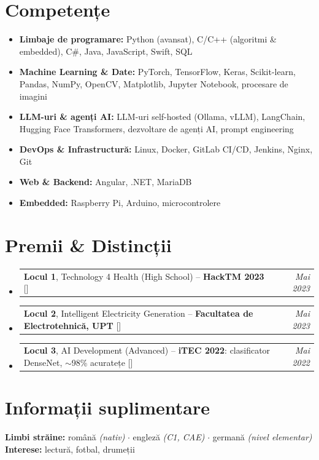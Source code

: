 \documentclass[a4paper,11pt]{article}
\makeatletter
\newcommand{\resumeItem}[2]{
  \item{
    \textbf{#1}{\hspace{0.5mm}#2 \vspace{-0.5mm}}
  }
}
\newcommand{\resumePOR}[3]{
\vspace{0.5mm}\item
    \begin{tabular*}{0.97\textwidth}[t]{l@{\extracolsep{\fill}}r}
        \textbf{#1}\hspace{0.3mm}#2 & \textit{\small{#3}} 
    \end{tabular*}
    \vspace{-2mm}
}
\newcommand{\resumeSubItem}[2]{\resumeItem{#1}{#2}\vspace{-4pt}}
\newcommand{\resumeSubHeadingListStart}{\begin{itemize}[leftmargin=*,labelsep=1mm]}
\newcommand{\resumeHeadingSkillStart}{\begin{itemize}[leftmargin=*,itemsep=1.7mm, rightmargin=2ex]}
\newcommand{\resumeSubHeadingListEnd}{\end{itemize}\vspace{2mm}}
\newcommand{\resumeHeadingSkillEnd}{\end{itemize}\vspace{-2mm}}
\makeatother
\begin{document}
\section{\textbf{Competențe}}
\vspace{-0.4mm}
 \resumeHeadingSkillStart
  \resumeSubItem{Limbaje de programare: }
    {Python (avansat), C/C++ (algoritmi \& embedded), C\#, Java, JavaScript, Swift, SQL}
  \resumeSubItem{Machine Learning \& Date: }
    {PyTorch, TensorFlow, Keras, Scikit-learn, Pandas, NumPy, OpenCV, Matplotlib, Jupyter Notebook, procesare de imagini}
  \resumeSubItem{LLM-uri \& agenți AI: }
    {LLM-uri self-hosted (Ollama, vLLM), LangChain, Hugging Face Transformers, dezvoltare de agenți AI, prompt engineering}
  \resumeSubItem{DevOps \& Infrastructură: }
    {Linux, Docker, GitLab CI/CD, Jenkins, Nginx, Git}
  \resumeSubItem{Web \& Backend: }
    {Angular, .NET, MariaDB}
  \resumeSubItem{Embedded: }
    {Raspberry Pi, Arduino, microcontrolere}
 \resumeHeadingSkillEnd


\section{\textbf{Premii \& Distincții}}
\vspace{-0.2mm}
\resumeSubHeadingListStart
\resumePOR{}{\textbf{Locul 1}, Technology 4 Health (High School) -- \textbf{HackTM 2023} [\href{https://github.com/VladTomici14/NeuroVault}{\textcolor{darkblue}{\faIcon{globe}}}]}{Mai 2023}
\resumePOR{}{\textbf{Locul 2}, Intelligent Electricity Generation -- \textbf{Facultatea de Electrotehnică, UPT} [\href{https://drive.google.com/file/d/1lGNVWn66y1pjQws85YHQjKOu8DPgJblN/view?usp=sharing}{\textcolor{darkblue}{\faIcon{globe}}}]}{Mai 2023}
\resumePOR{}{\textbf{Locul 3}, AI Development (Advanced) -- \textbf{iTEC 2022}: clasificator DenseNet, $\sim$98\% acuratețe [\href{https://github.com/VladTomici14/iTEC2022}{\textcolor{darkblue}{\faIcon{globe}}}]}{Mai 2022}
\resumeSubHeadingListEnd
\vspace{-3mm}

\section{\textbf{Informații suplimentare}}
\small{
\textbf{Limbi străine:} română \textit{(nativ)} $\cdot$ engleză \textit{(C1, CAE)} $\cdot$ germană \textit{(nivel elementar)}\\[1.5mm]


\textbf{Interese:} lectură, fotbal, drumeții
}
\end{document}
